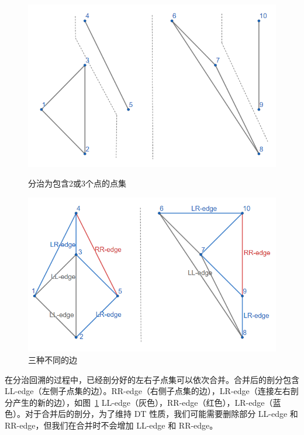 \begin{figure}[htbp]
    \centering
    \begin{minipage}{0.4\textwidth}
        \centering
        \includegraphics[width=\textwidth]
        {figures/DT2.png}
        \caption{分治为包含2或3个点的点集}
    \end{minipage}
    \begin{minipage}{0.4\textwidth}
        \centering
        \includegraphics[width=\textwidth]
        {figures/DT3.png}
        \caption{三种不同的边}
        \label{DT3}
    \end{minipage}
\end{figure}

在分治回溯的过程中，已经剖分好的左右子点集可以依次合并。合并后的剖分包含 LL-edge（左侧子点集的边）。RR-edge（右侧子点集的边），LR-edge（连接左右剖分产生的新的边），如图~\ref*{DT3} LL-edge（灰色），RR-edge（红色），LR-edge（蓝色）。对于合并后的剖分，为了维持 DT 性质，我们可能需要删除部分 LL-edge 和 RR-edge，但我们在合并时不会增加 LL-edge 和 RR-edge。


